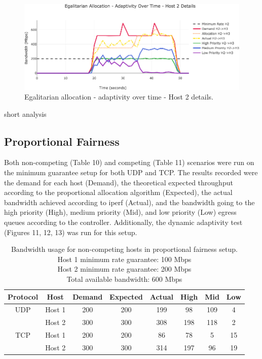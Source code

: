 \documentclass[accepted,single]{gipaper}
\begin{document}
\begin{figure}
	\centering
	\includegraphics[width=6in]{figs/dbae_ot_udp_h2.png}
	\caption{ Egalitarian allocation - adaptivity over time - Host 2 details. } \label{dbae_ot_h2}
\end{figure}

short analysis

\subsection{Proportional Fairness}
\label{dba_prop}

Both non-competing (Table 10) and competing (Table 11) scenarios were run on the minimum guarantee setup for both UDP and TCP. The results recorded were the demand for each host (Demand), the theoretical expected throughput according to the proportional allocation algorithm (Expected), the actual bandwidth achieved according to iperf (Actual), and the bandwidth going to the high priority (High), medium priority (Mid), and low priority (Low) egress queues according to the controller. Additionally, the dynamic adaptivity test (Figures 11, 12, 13) was run for this setup.

\begin{table}[h]
	\label{prop_nc}
	\vspace{-2mm}
	\begin{center}
		\begin{small}
		\setlength\tabcolsep{1.5pt}
			\begin{tabular}{cccccccc}
				Protocol & Host & Demand & Expected & Actual & High & Mid & Low\\
				\hline
				UDP & Host 1 & 200 & 200 & 199 & 98 & 109 & 4\\
				    & Host 2 & 300 & 300 & 308 & 198 & 118 & 2\\
				\hline
				TCP & Host 1 & 200 & 200 & 86 & 78 & 5 & 15\\
				    & Host 2 & 300 & 300 & 314 & 197 & 96 & 19\\
			\end{tabular}
		\end{small}
	\end{center}
	\caption{Bandwidth usage for non-competing hosts in proportional fairness setup.\\
	Host 1 minimum rate guarantee: 100 Mbps\\
	Host 2 minimum rate guarantee: 200 Mbps\\	
	Total available bandwidth: 600 Mbps}
	\vspace{-3mm}
\end{table}
\end{document}
